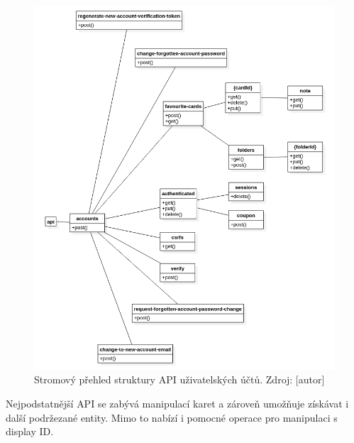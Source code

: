 		\begin{figure}[H]
			\centering
			\includegraphics[width=\linewidth]{obrazky/api_model_ucty}\hfill
			\caption{Stromový přehled struktury API uživatelských účtů. Zdroj: [autor]}
		\end{figure}

		Nejpodstatnější \ac{API} se zabývá manipulací karet a zároveň umožňuje získávat i další podržezané entity.
		Mimo to nabízí i pomocné operace pro manipulaci s display ID.

